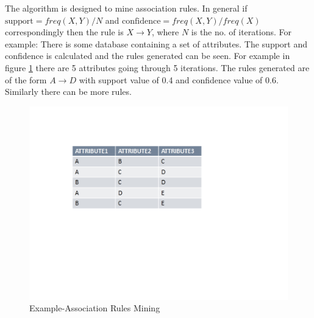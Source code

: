 \documentclass[conference]{IEEEtran}
\begin{document}
The algorithm is designed to mine association rules. In general if  $\mbox{support}=freq(X,Y)/N$ and      $\mbox{confidence}=freq(X,Y)/freq(X)$  correspondingly then the rule is $X \rightarrow Y$, where $N$ is the no. of iterations.  For example: There is some database containing a set of attributes. The support and confidence is calculated and the rules generated can be seen. For example in figure \ref{fig_asso} there are 5 attributes going through 5 iterations. The rules generated are of the form $A \rightarrow D$ with support value of 0.4 and confidence value of 0.6. Similarly there can be more rules.
\begin{figure}[!h]
\centering
\includegraphics[scale=0.8]{asso}
\caption{Example-Association Rules Mining}
\label{fig_asso}
\end{figure}
 

 
%
\end{document}
